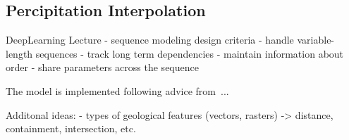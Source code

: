 \subsection{Percipitation Interpolation}



DeepLearning Lecture
- sequence modeling design criteria
    - handle variable-length sequences
    - track long term dependencies
    - maintain information about order
    - share parameters across the sequence

The model is implemented following advice from~\cite{rey2023geographic}...

Additonal ideas:
- types of geological features (vectors, rasters) -> distance, containment, intersection, etc. 
